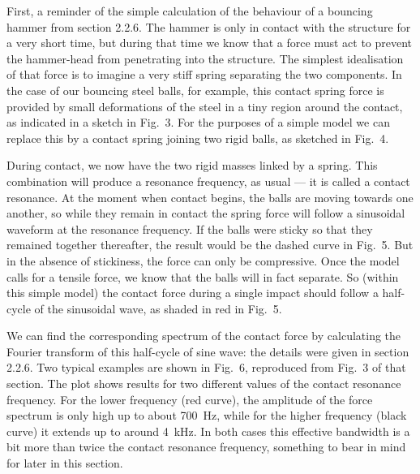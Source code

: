   First, a reminder of the simple calculation of the behaviour of a bouncing 
  hammer from section 2.2.6. The hammer is only in contact with the structure 
  for a very short time, but during that time we know that a force must act to 
  prevent the hammer-head from penetrating into the structure. The simplest 
  idealisation of that force is to imagine a very stiff spring separating the 
  two components. In the case of our bouncing steel balls, for example, this 
  contact spring force is provided by small deformations of the steel in a tiny 
  region around the contact, as indicated in a sketch in Fig.\ 3. For the 
  purposes of a simple model we can replace this by a contact spring joining 
  two rigid balls, as sketched in Fig.\ 4. 



  During contact, we now have the two rigid masses linked by a spring. This 
  combination will produce a resonance frequency, as usual — it is called a 
  contact resonance. At the moment when contact begins, the balls are moving 
  towards one another, so while they remain in contact the spring force will 
  follow a sinusoidal waveform at the resonance frequency. If the balls were 
  sticky so that they remained together thereafter, the result would be the 
  dashed curve in Fig.\ 5. But in the absence of stickiness, the force can only 
  be compressive. Once the model calls for a tensile force, we know that the 
  balls will in fact separate. So (within this simple model) the contact force 
  during a single impact should follow a half-cycle of the sinusoidal wave, as 
  shaded in red in Fig.\ 5. 


  We can find the corresponding spectrum of the contact force by calculating 
  the Fourier transform of this half-cycle of sine wave: the details were given 
  in section 2.2.6. Two typical examples are shown in Fig.\ 6, reproduced from 
  Fig.\ 3 of that section. The plot shows results for two different values of 
  the contact resonance frequency. For the lower frequency (red curve), the 
  amplitude of the force spectrum is only high up to about 700~Hz, while for 
  the higher frequency (black curve) it extends up to around 4~kHz. In both 
  cases this effective bandwidth is a bit more than twice the contact resonance 
  frequency, something to bear in mind for later in this section. 

